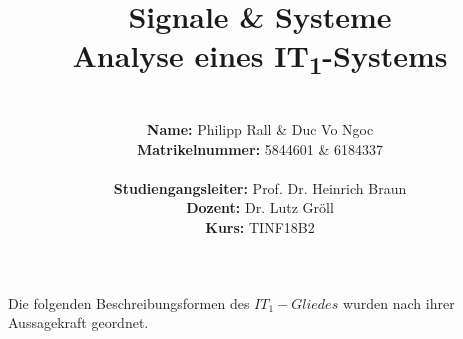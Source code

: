 \documentclass{article}
\title{\textbf{Signale \& Systeme \\ Analyse eines IT\textsubscript{1}-Systems}}
\author{
\vspace{8em} \\
\textbf{Name:} Philipp Rall \& Duc Vo Ngoc \\
\textbf{Matrikelnummer:} 5844601 \& 6184337 \\ \\
\textbf{Studiengangsleiter:} Prof. Dr. Heinrich Braun\\
\textbf{Dozent:} Dr. Lutz Gröll \\
\textbf{Kurs:} TINF18B2 \\
\vspace{8em} 
}
\begin{document}
\maketitle
\newpage
\noindent
Die folgenden Beschreibungsformen des $IT_1-Gliedes$ wurden nach ihrer \\ Aussagekraft geordnet.










\end{document}

